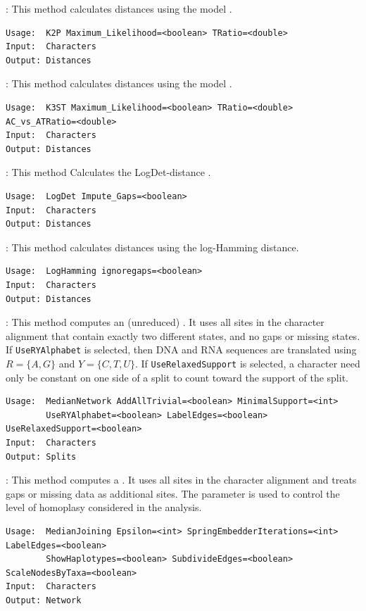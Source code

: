 \documentclass[11pt]{article}
\begin{document}
{}:
This method calculates distances using the  model
\cite{SOWH1996}.
\begin{verbatim}
Usage:  K2P Maximum_Likelihood=<boolean> TRatio=<double>
Input:  Characters
Output: Distances
\end{verbatim}

{}:
This method calculates distances using the  model
\cite{SOWH1996}.
\begin{verbatim}
Usage:  K3ST Maximum_Likelihood=<boolean> TRatio=<double> AC_vs_ATRatio=<double>
Input:  Characters
Output: Distances
\end{verbatim}

{}:
This method Calculates the LogDet-distance \cite{Steel94}.
\begin{verbatim}
Usage:  LogDet Impute_Gaps=<boolean>
Input:  Characters
Output: Distances
\end{verbatim}

{}:
This method calculates distances using the log-Hamming distance.
\begin{verbatim}
Usage:  LogHamming ignoregaps=<boolean>
Input:  Characters
Output: Distances
\end{verbatim}

{}:
This method computes an (unreduced)  \cite{MedianNetworks}.
It uses all sites in the character alignment that contain exactly two
different states, and no gaps or missing states.
If {\tt UseRYAlphabet} is selected, then DNA and RNA sequences are
translated using $R=\{A,G\}$ and $Y=\{C,T,U\}$.
If {\tt UseRelaxedSupport} is selected, a character need only be constant
on one side of a split to count toward the support of the split.
\begin{verbatim}
Usage:  MedianNetwork AddAllTrivial=<boolean> MinimalSupport=<int>
        UseRYAlphabet=<boolean> LabelEdges=<boolean> UseRelaxedSupport=<boolean>
Input:  Characters
Output: Splits
\end{verbatim}

{}:
This method computes a  \cite{Bandelt1999}.
It uses all sites in the character alignment and treats gaps
or missing data as additional sites. The parameter 
is used to control the level of homoplasy considered in the analysis.
\begin{verbatim}
Usage:  MedianJoining Epsilon=<int> SpringEmbedderIterations=<int> LabelEdges=<boolean>
        ShowHaplotypes=<boolean> SubdivideEdges=<boolean> ScaleNodesByTaxa=<boolean>
Input:  Characters
Output: Network
\end{verbatim}
\end{document}
